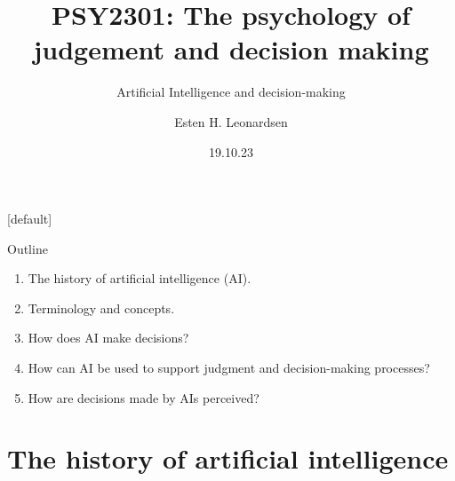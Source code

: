 \documentclass[8pt]{beamer}
\date{19.10.23}
\title{PSY2301: The psychology of judgement and decision making}
\subtitle{Artificial Intelligence and decision-making}
\author{Esten H. Leonardsen}
\begin{document}
  	[default]

	\begin{frame}
		\maketitle
	\end{frame}

	\begin{frame}{Outline}
		\begin{enumerate}
			\item The history of artificial intelligence (AI).
			\item Terminology and concepts.
			\item How does AI make decisions?
			\item How can AI be used to support judgment and decision-making processes?
			\item How are decisions made by AIs perceived?
		\end{enumerate}
	\end{frame}


	\section{The history of artificial intelligence}
\end{document}

